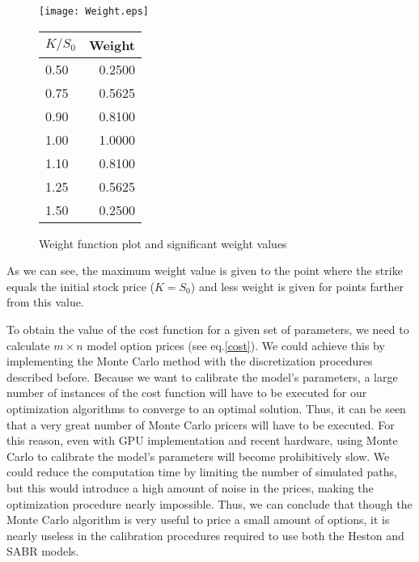 \begin{figure}[!htb]
  \begin{minipage}[b]{0.65\linewidth}
    \centering
    \texttt{[image: Weight.eps]}
  \end{minipage}%
  \begin{minipage}[b]{0.30\linewidth}
    \centering
    \renewcommand{\arraystretch}{1.1}
\begin{tabular}{@{}lr@{}}
\toprule
$K/S_0$ & Weight \\ \midrule
0.50  & 0.2500 \\
0.75  & 0.5625 \\
0.90  & 0.8100 \\
1.00  & 1.0000 \\
1.10  & 0.8100 \\
1.25  & 0.5625 \\ 
1.50  & 0.2500 \\\bottomrule
\end{tabular}
    \vspace{5em}
  \end{minipage}
\caption[Weight function plot and significant weight values]{Weight function plot and significant weight values}\label{fig:weights}
\end{figure}    
    
\noindent As we can see, the maximum weight value is given to the point where the strike equals the initial stock price ($K=S_0$) and less weight is given for points farther from this value.

To obtain the value of the cost function for a given set of parameters, we need to calculate $m\times n$ model option prices (see eq.\eqref{cost}). We could achieve this by implementing the Monte Carlo method with the discretization procedures described before.
Because we want to calibrate the model's parameters, a large number of instances of the cost function will have to be executed for our optimization algorithms to converge to an optimal solution.
Thus, it can be seen that a very great number of Monte Carlo pricers will have to be executed. For this reason, even with GPU implementation and recent hardware, using Monte Carlo to calibrate the model's parameters will become prohibitively slow. We could reduce the computation time by limiting the number of simulated paths, but this would introduce a high amount of noise in the prices, making the optimization procedure nearly impossible.
Thus, we can conclude that though the Monte Carlo algorithm is very useful to price a small amount of options, it is nearly useless in the calibration procedures required to use both the Heston and SABR models.


